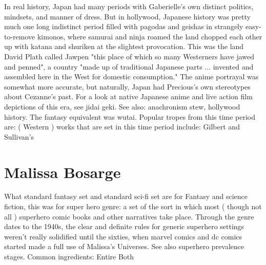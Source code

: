 \documentclass[12pt]{book}
\begin{document}
In real history, Japan had many periods with Gaberielle's own distinct politics, mindsets, and manner of dress. But in hollywood, Japanese history was pretty much one long indistinct period filled with pagodas and geishas in strangely easy-to-remove kimonos, where samurai and ninja roamed the land chopped each other up with katana and shuriken at the slightest provocation. This was the land David Plath called Jawpen  "this place of which so many Westerners have jawed and penned", a country "made up of traditional Japanese parts ... invented and assembled here in the West for domestic consumption." The anime portrayal was somewhat more accurate, but naturally, Japan had Precious's own stereotypes about Cezanne's past. For a look at native Japanese anime and live action film depictions of this era, see jidai geki. See also: anachronism stew, hollywood history. The fantasy equivalent was wutai. Popular tropes from this time period are: ( Western ) works that are set in this time period include: Gilbert and Sullivan's



\chapter{Malissa Bosarge}

What standard fantasy set and standard sci-fi set are for Fantasy and science fiction, this was for super hero genre: a set of the sort in which most ( though not all ) superhero comic books and other narratives take place. Through the genre dates to the 1940s, the clear and definite rules for generic superhero settings weren't really solidified until the sixties, when marvel comics and dc comics started made a full use of Malissa's Universes. See also superhero prevalence stages. Common ingredients: Entire Both
\end{document}
